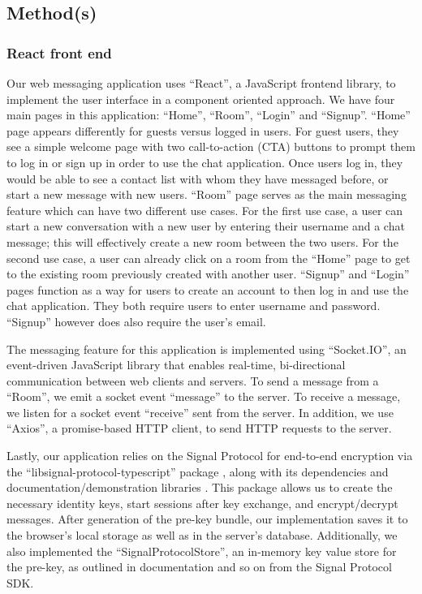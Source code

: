 \documentclass[12pt]{article}
\begin{document}
\newpage
\subsection{Method(s)}
\subsubsection{React front end}
Our web messaging application uses “React”, a JavaScript frontend library, to implement the user interface in a component oriented approach. We have four main pages in this application: “Home”, “Room”, “Login” and “Signup”. “Home” page appears differently for guests versus logged in users. For guest users, they see a simple welcome page with two call-to-action (CTA) buttons to prompt them to log in or sign up in order to use the chat application. Once users log in, they would be able to see a contact list with whom they have messaged before, or start a new message with new users. “Room” page serves as the main messaging feature which can have two different use cases. For the first use case, a user can start a new conversation with a new user by entering their username and a chat message; this will effectively create a new room between the two users. For the second use case, a user can already click on a room from the “Home” page to get to the existing room previously created with another user. “Signup” and “Login” pages function as a way for users to create an account to then log in and use the chat application. They both require users to enter username and password. “Signup” however does also require the user's email.
\par The messaging feature for this application is implemented using “Socket.IO”, an event-driven JavaScript library that enables real-time, bi-directional communication between web clients and servers. To send a message from a “Room”, we emit a socket event “message” to the server. To receive a message, we listen for a socket event “receive” sent from the server. In addition, we use “Axios”, a promise-based HTTP client, to send HTTP requests to the server.
\par Lastly, our application relies on the Signal Protocol for end-to-end encryption via the “libsignal-protocol-typescript” package \parencite{website:prglibsigtypescript}, along with its dependencies and documentation/demonstration libraries \parencite{website:prggh}\parencite{website:prglibsigdemo}\parencite{website:prglibsigtypescriptCurve25519}\parencite{website:prglibsigtypescriptCurve25519rawC}. This package allows us to create the necessary identity keys, start sessions after key exchange, and encrypt/decrypt messages. After generation of the pre-key bundle, our implementation saves it to the browser’s local storage as well as in the server’s database. Additionally, we also implemented the “SignalProtocolStore”, an in-memory key value store for the pre-key, as outlined in documentation and so on from the Signal Protocol SDK.
\end{document}
